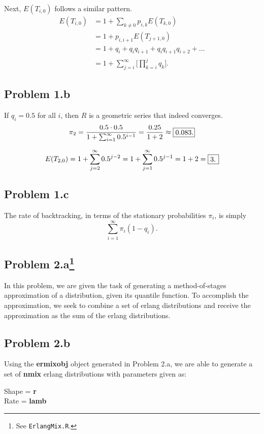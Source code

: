 \documentclass[letter]{article}
\newcounter{foot}
\begin{document}
Next, $E(T_{i,0})$ follows a similar pattern. 
\begin{equation*}
  \begin{aligned}
      E(T_{i,0}) &= 1 + \sum_{k \ne 0}{p_{i,k}E(T_{k,0})} \\ 
                 &= 1 + p_{i,i+1}E(T_{j+1,0}) \\
                 &= 1 + q_i + q_iq_{i+1} + q_iq_{i+1}q_{i+2} + \dots \\
                 &= 1 + \sum_{j=i}^\infty{\Big[ \prod_{k=i}^{j}{q_k} \Big]}.
  \end{aligned}
\end{equation*}


\subsection*{Problem 1.b}
If $q_i = 0.5$ for all $i$, then $R$ is a geometric series that indeed converges. 
$$ \pi_2 = \frac{0.5 \cdot 0.5}{1 + \sum_{i=1}^\infty{0.5^{i-1}}} = 
           \frac{0.25}{1+2} \approx \fbox {\parbox{0.33in}{0.083.}}$$

$$ E(T_{2,0}) = 1 + \sum_{j=2}^\infty{0.5^{j-2}} 
              = 1 + \sum_{j=1}^\infty{0.5^{j-1}} = 1 + 2 = \fbox{\parbox{0.12in}{3.}} $$

\subsection*{Problem 1.c}
The rate of backtracking, in terms of the stationary probabilities $\pi_i$, is simply
$$ \sum_{i=1}^\infty{\pi_i(1 - q_i)}. $$


\pagebreak
\subsection*{Problem 2.a\footnote{See \texttt{ErlangMix.R}.}}
    In this problem, we are given the task of generating a method-of-stages approximation of a distribution, given its quantile function.  To accomplish the approximation, we seek to combine a set of erlang distributions and receive the approximation as the sum of the erlang distributions.

\subsection*{Problem 2.b}

    Using the \textbf{ermixobj} object generated in Problem 2.a, we are able to generate a set of \textbf{nmix} erlang distributions with
parameters given as:\\
\begin{center}
\large{
Shape = \textbf{r}\\
Rate = \textbf{lamb}\\
}
\end{center}
  
\end{document}
